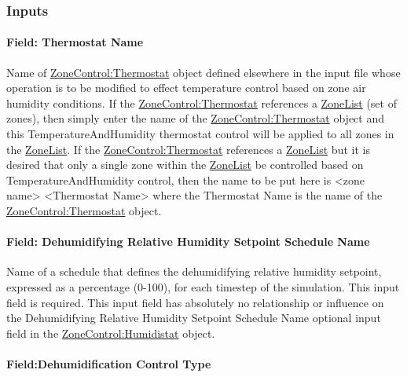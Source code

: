 \subsubsection{Inputs}\label{inputs-6-031}

\paragraph{Field: Thermostat Name}\label{field-thermostat-name-1}

Name of \hyperref[zonecontrolthermostat]{ZoneControl:Thermostat} object defined elsewhere in the input file whose operation is to be modified to effect temperature control based on zone air humidity conditions. If the \hyperref[zonecontrolthermostat]{ZoneControl:Thermostat} references a \hyperref[zonelist]{ZoneList} (set of zones), then simply enter the name of the \hyperref[zonecontrolthermostat]{ZoneControl:Thermostat} object and this TemperatureAndHumidity thermostat control will be applied to all zones in the \hyperref[zonelist]{ZoneList}. If the \hyperref[zonecontrolthermostat]{ZoneControl:Thermostat} references a \hyperref[zonelist]{ZoneList} but it is desired that only a single zone within the \hyperref[zonelist]{ZoneList} be controlled based on TemperatureAndHumidity control, then the name to be put here is \textless{}zone name\textgreater{} \textless{}Thermostat Name\textgreater{} where the Thermostat Name is the name of the \hyperref[zonecontrolthermostat]{ZoneControl:Thermostat} object.

\paragraph{Field: Dehumidifying Relative Humidity Setpoint Schedule Name}\label{field-dehumidifying-relative-humidity-setpoint-schedule-name}

Name of a schedule that defines the dehumidifying relative humidity setpoint, expressed as a percentage (0-100), for each timestep of the simulation. This input field is required. This input field has absolutely no relationship or influence on the Dehumidifying Relative Humidity Setpoint Schedule Name optional input field in the \hyperref[zonecontrolhumidistat]{ZoneControl:Humidistat} object.

\paragraph{Field:Dehumidification Control Type}\label{fielddehumidification-control-type}

